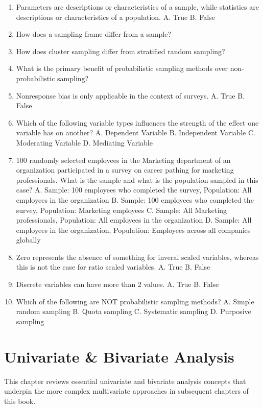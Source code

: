 \documentclass[]{book}
\begin{document}
\begin{enumerate}
\def\labelenumi{\arabic{enumi}.}
\item
  Parameters are descriptions or characteristics of a sample, while statistics are descriptions or characteristics of a population.
  A. True
  B. False
\item
  How does a sampling frame differ from a sample?
\item
  How does cluster sampling differ from stratified random sampling?
\item
  What is the primary benefit of probabilistic sampling methods over non-probabilistic sampling?
\item
  Nonresponse bias is only applicable in the context of surveys.
  A. True
  B. False
\item
  Which of the following variable types influences the strength of the effect one variable has on another?
  A. Dependent Variable
  B. Independent Variable
  C. Moderating Variable
  D. Mediating Variable
\item
  100 randomly selected employees in the Marketing department of an organization participated in a survey on career pathing for marketing professionals. What is the sample and what is the population sampled in this case?
  A. Sample: 100 employees who completed the survey, Population: All employees in the organization
  B. Sample: 100 employees who completed the survey, Population: Marketing employees
  C. Sample: All Marketing professionals, Population: All employees in the organization
  D. Sample: All employees in the organization, Population: Employees across all companies globally
\item
  Zero represents the absence of something for inveral scaled variables, whereas this is not the case for ratio scaled variables.
  A. True
  B. False
\item
  Discrete variables can have more than 2 values.
  A. True
  B. False
\item
  Which of the following are NOT probabilistic sampling methods?
  A. Simple random sampling
  B. Quota sampling
  C. Systematic sampling
  D. Purposive sampling
\end{enumerate}

\hypertarget{uni-bi-stats}{%
\chapter{Univariate \& Bivariate Analysis}\label{uni-bi-stats}}

This chapter reviews essential univariate and bivariate analysis concepts that underpin the more complex multivariate approaches in subsequent chapters of this book.
\end{document}
